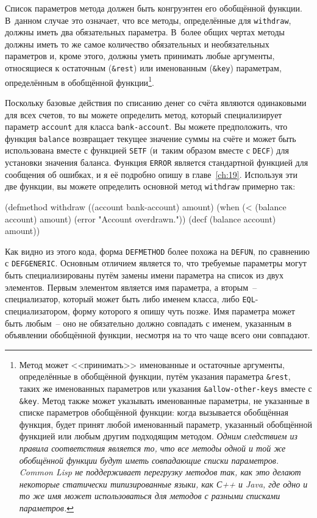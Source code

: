 Список параметров метода должен быть конгруэнтен его обобщённой функции.  В~данном случае
это означает, что все методы, определённые для \lstinline{withdraw}, должны иметь два
обязательных параметра.  В~более общих чертах методы должны иметь то же самое количество
обязательных и необязательных параметров и, кроме этого, должны уметь принимать любые
аргументы, относящиеся к остаточным (\lstinline!&rest!) или именованным (\lstinline!&key!)
параметрам, определённым в обобщённой функции\footnote{Метод может <<принимать>>
  именованные и остаточные аргументы, определённые в обобщённой функции, путём указания
  параметра \lstinline!&rest!, таких же именованных параметров или указания
  \lstinline!&allow-other-keys! вместе с \lstinline!&key!.  Метод также может указывать
  именованные параметры, не указанные в списке параметров обобщённой функции: когда
  вызывается обобщённая функция, будет принят любой именованный параметр, указанный
  обобщённой функцией или любым другим подходящим методом.  \textit{Одним следствием
    из правила соответствия является то, что все методы одной и той же обобщённой функции
    будут иметь совпадающие списки параметров.  Common Lisp не поддерживает перегрузку
    методов так, как это делают некоторые статически типизированные языки, как С++ и Java,
    где одно и то же имя может использоваться для методов с разными списками параметров.}}\hspace{\footnotenegspace}.

Поскольку базовые действия по списанию денег со счёта являются одинаковыми для всех
счетов, то вы можете определить метод, который специализирует параметр \lstinline{account}
для класса \lstinline{bank-account}.  Вы можете предположить, что функция
\lstinline{balance} возвращает текущее значение суммы на счёте и может быть использована
вместе с функцией \lstinline{SETF} (и~таким образом вместе с \lstinline{DECF}) для
установки значения баланса.  Функция \lstinline{ERROR} является стандартной функцией для
сообщения об ошибках, и я её подробно опишу в главе~\ref{ch:19}.  Используя эти две
функции, вы можете определить основной метод \lstinline{withdraw} примерно так:

\begin{myverb}
(defmethod withdraw ((account bank-account) amount)
  (when (< (balance account) amount)
    (error "Account overdrawn."))
  (decf (balance account) amount))
\end{myverb}

Как видно из этого кода, форма \lstinline{DEFMETHOD} более похожа на \lstinline{DEFUN}, по сравнению
с \lstinline{DEFGENERIC}.  Основным отличием является то, что требуемые параметры могут быть
специализированы путём замены имени параметра на список из двух элементов.  Первым
элементом является имя параметра, а вторым~-- специализатор, который может быть либо
именем класса, либо \lstinline{EQL}-специализатором, форму которого я опишу чуть позже.  Имя
параметра может быть любым~-- оно не обязательно должно совпадать с именем, указанным в
объявлении обобщённой функции, несмотря на то что чаще всего они совпадают.

